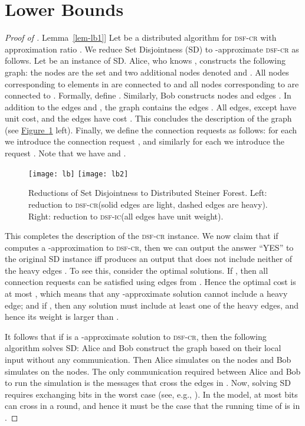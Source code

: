 \documentclass[letterpaper,11pt]{article}
\newcommand{\namedref}[2]{\hyperref[#2]{#1~\ref*{#2}}}
\newcommand{\figureref}[1]{\namedref{Figure}{#1}}
\newcommand{\lemmaref}[1]{\namedref{Lemma}{#1}}
\newcommand{\sfcr}{\textsc{dsf-cr}\xspace}
\newcommand{\sfic}{\textsc{dsf-ic}\xspace}
\begin{document}
\section{Lower Bounds}
\label{app-lb}
\begin{proof}[Proof of \lemmaref{lem-lb1}]
Let  be a distributed algorithm for \sfcr with approximation
ratio . 
We reduce Set Disjointness (SD) to -approximate \sfcr as follows.
Let  be an instance of SD. Alice, who knows ,
constructs the following graph: the nodes are the set
 and two additional nodes denoted  and
. 
All nodes corresponding to elements in  are connected to  and
all nodes corresponding to  are connected to
. Formally, define .
Similarly, Bob  constructs nodes  and edges 
.
In addition to the edges  and , the graph contains the edges
. 
All edges, except  have unit cost,
and the edges  have cost
.
This concludes the description of the graph (see \figureref{fig-lb} left). 
Finally, we define the
connection requests 
as follows: for each  we introduce the connection request
, and similarly for each  we introduce the
request . Note that we have  and .

\begin{figure}[t]
  \centering
  \texttt{[image: lb]}\hspace*{15mm}
  \texttt{[image: lb2]}
  \caption{\small Reductions of Set Disjointness to Distributed Steiner
    Forest. Left: reduction to \sfcr (solid edges are light, dashed
    edges are heavy). Right: reduction to \sfic (all edges have unit weight).} 
  \label{fig-lb}
\end{figure}
This completes the description of the \sfcr instance. We now claim
that if  computes a -approxima\-tion to \sfcr, then we can output
the answer ``YES'' to
the original SD instance iff  produces an output that does not
include neither of the heavy edges
. To see this, consider the optimal
solutions. If , then all connection requests can be
satisfied using edges from . Hence the optimal cost is at most
, which means that any -approximate solution cannot include
a heavy edge; and if , then any solution must
include at least one of the
heavy edges, and hence its weight is larger than .

It follows that if  is a -approximate solution to \sfcr,
then the following algorithm solves SD: Alice and Bob construct the
graph based on their local input without any communication. Then Alice
simulates  on the  nodes  and Bob simulates  on
the  nodes. The only communication required between Alice
and Bob to run the simulation is the messages that cross the edges in
. Now,  solving SD requires exchanging  bits
in the worst case (see,
e.g., \cite{KushilevitzN-book}). In the  model,
at most  bits can cross  in a round, and hence it must
be the case that the running time of  is in
.
\end{proof}
\end{document}
